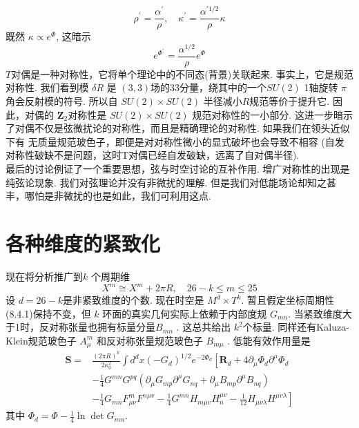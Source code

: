 \begin{equation}
	\rho^{\prime}=\frac{\alpha^{\prime}}{\rho}, \quad \kappa^{\prime}=\frac{\alpha^{\prime 1 / 2}}{\rho} \kappa
\end{equation}
既然 $\kappa \propto e^{\Phi}$, 这暗示
\begin{equation}
	e^{\Phi^{\prime}}=\frac{\alpha^{1 / 2}}{\rho} e^{\Phi}
\end{equation}
$T$对偶是一种对称性，它将单个理论中的不同态(背景)关联起来. 事实上，它是规范对称性. 我们看到模 $\delta R$ 是 $(3,3)$场的33分量，绕其中的一个$S U(2)$ 1轴旋转 $\pi$角会反射模的符号. 所以自 $S U(2) \times S U(2)$ 半径减小$R$规范等价于提升它. 因此，对偶的 $\mathbf{Z}_{2}$对称性是  $S U(2) \times S U(2)$ 规范对称性的一小部分. 这进一步暗示了对偶不仅是弦微扰论的对称性，而且是精确理论的对称性. 如果我们在领头近似下有  无质量规范玻色子，即便是对对称性微小的显式破坏也会导致不相容 (自发对称性破缺不是问题，这时T对偶已经自发破缺，远离了自对偶半径).\\
最后的讨论例证了一个重要思想，弦与时空讨论的互补作用. 增广对称性的出现是纯弦论现象. 我们对弦理论并没有非微扰的理解. 但是我们对低能场论却知之甚丰，哪怕是非微扰的也是如此，我们可利用这点.

\section{各种维度的紧致化}%
现在将分析推广到$k$ 个周期维
\begin{equation}
	X^{m} \cong X^{m}+2 \pi R, \quad 26-k \leq m \leq 25
\end{equation}
设 $d=26-k$是非紧致维度的个数. 现在时空是 $M^{d} \times T^{k}$. 暂且假定坐标周期性 (8.4.1)保持不变，但 $k$ 环面的真实几何实际上依赖于内部度规 $G_{m n}$. 当紧致维度大于1时，反对称张量也拥有标量分量$B_{m n} $ . 这总共给出 $k^{2}$个标量. 同样还有Kaluza-Klein规范玻色子 $A_{\mu}^{m}$ 和反对称张量规范玻色子 $B_{m \mu} $ . 低能有效作用量是
\begin{equation}
	\begin{aligned}
		\boldsymbol{S}=& \frac{(2 \pi R)^{k}}{2 \kappa_{0}^{2}} \int d^{d} x\left(-G_{d}\right)^{1 / 2} e^{-2 \Phi_{d}}\left[\boldsymbol{R}_{d}+4 \partial_{\mu} \Phi_{d} \partial^{\mu} \Phi_{d}\right.\\
		&-\frac{1}{4} G^{m n} G^{p q}\left(\partial_{\mu} G_{m p} \partial^{\mu} G_{n q}+\partial_{\mu} B_{m p} \partial^{\mu} B_{n q}\right) \\
		&\left.-\frac{1}{4} G_{m n} F_{\mu \nu}^{m} F^{n \mu v}-\frac{1}{4} G^{m n} H_{m \mu v} H_{n}^{\mu v}-\frac{1}{12} H_{\mu \nu \lambda} H^{\mu v \lambda}\right]
	\end{aligned}
\end{equation}
其中 $\Phi_{d}=\Phi-\frac{1}{4} \ln \operatorname{det} G_{m n}$.

